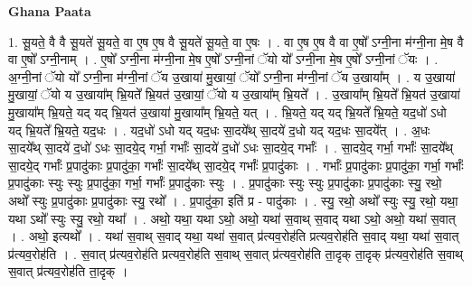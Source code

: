 \documentclass[17pt]{extarticle}
\begin{document}
\textbf{Ghana Paata } \newline

1. सू॒यते॒ वै वै सू॒यते॑ सू॒यते॒ वा ए॒ष ए॒ष वै सू॒यते॑ सू॒यते॒ वा ए॒षः । . वा ए॒ष ए॒ष वै वा ए॒षो᳚ ऽग्नी॒ना म॑ग्नी॒ना मे॒ष वै वा ए॒षो᳚ ऽग्नी॒नाम् । . ए॒षो᳚ ऽग्नी॒ना म॑ग्नी॒ना मे॒ष ए॒षो᳚ ऽग्नी॒नां ॅयो यो᳚ ऽग्नी॒ना मे॒ष ए॒षो᳚ ऽग्नी॒नां ॅयः । . अ॒ग्नी॒नां ॅयो यो᳚ ऽग्नी॒ना म॑ग्नी॒नां ॅय उ॒खाया॑ मु॒खायां॒ ॅयो᳚ ऽग्नी॒ना म॑ग्नी॒नां ॅय उ॒खाया᳚म् । . य उ॒खाया॑ मु॒खायां॒ ॅयो य उ॒खाया᳚म् भ्रि॒यते᳚ भ्रि॒यत॑ उ॒खायां॒ ॅयो य उ॒खाया᳚म् भ्रि॒यते᳚ । . उ॒खाया᳚म् भ्रि॒यते᳚ भ्रि॒यत॑ उ॒खाया॑ मु॒खाया᳚म् भ्रि॒यते॒ यद् यद् भ्रि॒यत॑ उ॒खाया॑ मु॒खाया᳚म् भ्रि॒यते॒ यत् । . भ्रि॒यते॒ यद् यद् भ्रि॒यते᳚ भ्रि॒यते॒ यद॒धो॑ ऽधो यद् भ्रि॒यते᳚ भ्रि॒यते॒ यद॒धः । . यद॒धो॑ ऽधो यद् यद॒धः सा॒दये᳚थ् सा॒दये॑ द॒धो यद् यद॒धः सा॒दये᳚त् । . अ॒धः सा॒दये᳚थ् सा॒दये॑ द॒धो॑ ऽधः सा॒दये॒द् गर्भा॒ गर्भाः᳚ सा॒दये॑ द॒धो॑ ऽधः सा॒दये॒द् गर्भाः᳚ । . सा॒दये॒द् गर्भा॒ गर्भाः᳚ सा॒दये᳚थ् सा॒दये॒द् गर्भाः᳚ प्र॒पादु॑काः प्र॒पादु॑का॒ गर्भाः᳚ सा॒दये᳚थ् सा॒दये॒द् गर्भाः᳚ प्र॒पादु॑काः । . गर्भाः᳚ प्र॒पादु॑काः प्र॒पादु॑का॒ गर्भा॒ गर्भाः᳚ प्र॒पादु॑काः स्युः स्युः प्र॒पादु॑का॒ गर्भा॒ गर्भाः᳚ प्र॒पादु॑काः स्युः । . प्र॒पादु॑काः स्युः स्युः प्र॒पादु॑काः प्र॒पादु॑काः स्यु॒ रथो॒ अथो᳚ स्युः प्र॒पादु॑काः प्र॒पादु॑काः स्यु॒ रथो᳚ । . प्र॒पादु॑का॒ इति॑ प्र - पादु॑काः । . स्यु॒ रथो॒ अथो᳚ स्युः स्यु॒ रथो॒ यथा॒ यथा ऽथो᳚ स्युः स्यु॒ रथो॒ यथा᳚ । . अथो॒ यथा॒ यथा ऽथो॒ अथो॒ यथा॑ स॒वाथ् स॒वाद् यथा ऽथो॒ अथो॒ यथा॑ स॒वात् । . अथो॒ इत्यथो᳚ । . यथा॑ स॒वाथ् स॒वाद् यथा॒ यथा॑ स॒वात् प्र॑त्यव॒रोह॑ति प्रत्यव॒रोह॑ति स॒वाद् यथा॒ यथा॑ स॒वात् प्र॑त्यव॒रोह॑ति । . स॒वात् प्र॑त्यव॒रोह॑ति प्रत्यव॒रोह॑ति स॒वाथ् स॒वात् प्र॑त्यव॒रोह॑ति ता॒दृक् ता॒दृक् प्र॑त्यव॒रोह॑ति स॒वाथ् स॒वात् प्र॑त्यव॒रोह॑ति ता॒दृक् । \newline
\end{document}
